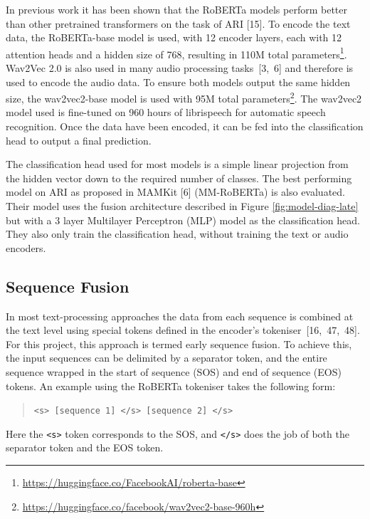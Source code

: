 \documentclass[twocolumn]{article}
\begin{document}
In previous work it has been shown that the RoBERTa models perform
better than other pretrained transformers on the task of ARI {[}15{]}.
To encode the text data, the RoBERTa-base model is used, with 12 encoder
layers, each with 12 attention heads and a hidden size of 768, resulting
in 110M total parameters\footnote{\url{https://huggingface.co/FacebookAI/roberta-base}}.
Wav2Vec 2.0 is also used in many audio processing \mbox{tasks {[}3, 6{]}}
and therefore is used to encode the audio data. To ensure both models
output the same hidden size, the wav2vec2-base model is used with 95M
total parameters\footnote{\url{https://huggingface.co/facebook/wav2vec2-base-960h}}.
The wav2vec2 model used is fine-tuned on 960 hours of librispeech for
automatic speech recognition. Once the data have been encoded, it can be
fed into the classification head to output a final prediction.

The classification head used for most models is a simple linear
projection from the hidden vector down to the required number of
classes. The best performing model on ARI as proposed in MAMKit {[}6{]}
(MM-RoBERTa) is also evaluated. Their model uses the fusion architecture
described in Figure \ref{fig:model-diag-late} but with a 3 layer
Multilayer Perceptron (MLP) model as the classification head. They also
only train the classification head, without training the text or audio
encoders.

\subsection{Sequence Fusion}\label{sec:seq-fusion}

In most text-processing approaches the data from each sequence is
combined at the text level using special tokens defined in the encoder's
\mbox{tokeniser {[}16, 47, 48{]}}. For this project, this approach
is termed early sequence fusion. To achieve this, the input sequences
can be delimited by a separator token, and the entire sequence wrapped
in the start of sequence (SOS) and end of sequence (EOS) tokens. An
example using the RoBERTa tokeniser takes the following form:

\begin{quote}
\texttt{\textless{}s\textgreater{}\ {[}sequence\ 1{]}\ \textless{}/s\textgreater{}\ {[}sequence\ 2{]}\ \textless{}/s\textgreater{}}
\end{quote}

Here the \texttt{\textless{}s\textgreater{}} token corresponds to the
SOS, and \texttt{\textless{}/s\textgreater{}} does the job of both the
separator token and the EOS token.
\end{document}
